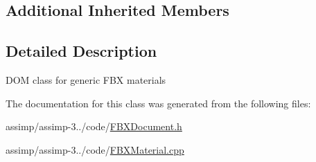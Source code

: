 \subsection*{Additional Inherited Members}


\subsection{Detailed Description}
D\+O\+M class for generic F\+B\+X materials 

The documentation for this class was generated from the following files\+:\begin{DoxyCompactItemize}
\item 
assimp/assimp-\/3../code/\hyperlink{_f_b_x_document_8h}{F\+B\+X\+Document.\+h}\item 
assimp/assimp-\/3../code/\hyperlink{_f_b_x_material_8cpp}{F\+B\+X\+Material.\+cpp}\end{DoxyCompactItemize}
